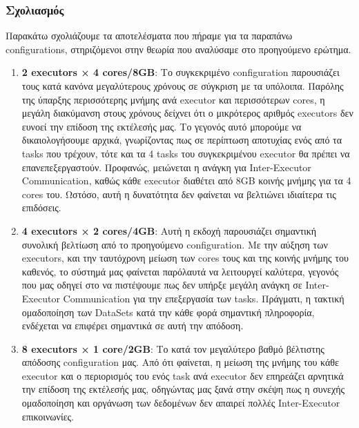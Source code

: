 \documentclass{article}
\begin{document}
\subsubsection*{ Σχολιασμός }
Παρακάτω σχολιάζουμε τα αποτελέσματα που πήραμε για τα παραπάνω configurations, στηριζόμενοι στην θεωρία που αναλύσαμε στο προηγούμενο ερώτημα. 
\begin{enumerate}
	\item \textbf{2 executors × 4 cores/8GB}: Το συγκεκριμένο configuration παρουσιάζει τους κατά κανόνα μεγαλύτερους χρόνους σε σύγκριση με τα υπόλοιπα. Παρόλης της ύπαρξης περισσότερης μνήμης ανά executor και περισσότερων cores, η μεγάλη διακύμανση στους χρόνους δείχνει ότι ο μικρότερος αριθμός executors δεν ευνοεί την επίδοση της εκτέλεσής μας. Το γεγονός αυτό μπορούμε να δικαιολογήσουμε αρχικά, γνωρίζοντας πως σε περίπτωση αποτυχίας ενός από τα tasks που τρέχουν, τότε και τα 4 tasks του συγκεκριμένου executor θα πρέπει να επανεπεξεργαστούν. Προφανώς, μειώνεται η ανάγκη για Inter-Executor Communication, καθώς κάθε executor διαθέτει από 8GB κοινής μνήμης για τα 4 cores του. Ωστόσο, αυτή η δυνατότητα δεν φαίνεται να βελτιώνει ιδιαίτερα τις επιδόσεις. 
	\item \textbf{4 executors × 2 cores/4GB}: Αυτή η εκδοχή παρουσιάζει σημαντική συνολική βελτίωση από το προηγούμενο configuration. Με την αύξηση των executors, και την ταυτόχρονη μείωση των cores τους και της κοινής μνήμης του καθενός, το σύστημά μας φαίνεται παρόλαυτά να λειτουργεί καλύτερα, γεγονός που μας οδηγεί στο να πιστέψουμε πως δεν υπήρξε μεγάλη ανάγκη σε Inter-Executor Communication για την επεξεργασία των tasks. Πράγματι, η τακτική ομαδοποίηση των DataSets κατά την κάθε φορά σημαντική πληροφορία, ενδέχεται να επιφέρει σημαντικά σε αυτή την απόδοση. 
	\item \textbf{8 executors × 1 core/2GB}: Το κατά τον μεγαλύτερο βαθμό βέλτιστης απόδοσης configuration μας. Από ότι φαίνεται, η μείωση της μνήμης του κάθε executor και ο περιορισμός του ενός task ανά executor δεν επηρεάζει αρνητικά την επίδοση της εκτέλεσής μας, οδηγώντας μας ξανά στην σκέψη πως η συνεχής ομαδοποίηση και οργάνωση των δεδομένων δεν απαιρεί πολλές Inter-Executor επικοινωνίες. 
	
\end{enumerate}
\end{document}
